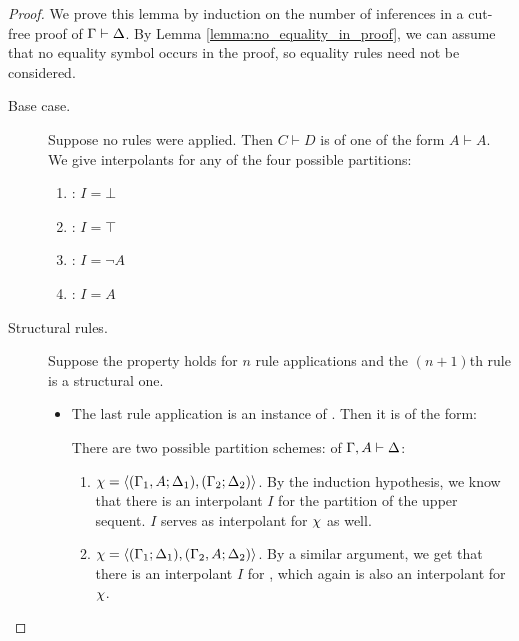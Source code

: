\begin{proof}
	We prove this lemma by induction on the number of inferences in a cut-free proof of $\Gamma \vdash \Delta$.
	By Lemma \ref{lemma:no_equality_in_proof}, we can assume that no equality symbol occurs in the proof, so equality rules need not be considered. 
	\begin{description}
		\item[\normalfont Base case.]
			Suppose no rules were applied.
			Then $C \vdash D$ is of one of the form
				$A \vdash A$. We give interpolants for any of the four possible partitions:
					\begin{enumerate}
						\item {}: $I=\bot$
						\item {}: $I=\top$
						\item {}: $I=\lnot A$\nopagebreak
						\item {}: $I=A$
					\end{enumerate}

		\item[\normalfont Structural rules.]
			Suppose the property holds for $n$ rule applications and the $(n+1)$th rule is a structural one.

			\begin{itemize}
				\item The last rule application is an instance of . Then it is of the form:
					\begin{prooftree}
					\end{prooftree}

					There are two possible partition schemes: of $\Gamma, A \vdash \Delta$:
					\begin{enumerate}
						\item $\chi =  \langle (\Gamma_1, A; \Delta_1), (\Gamma_2; \Delta_2)\rangle $.
							By the induction hypothesis, we know that there is an interpolant $I$ for the partition  of the upper sequent.
							$I$ serves as interpolant for $\chi$ as well.

						\item $\chi =  \langle (\Gamma_1; \Delta_1), (\Gamma_2, A; \Delta_2)\rangle $.
							By a similar argument, we get that there is an interpolant $I$ for 
							, which again is also an interpolant for $\chi$.


\end{enumerate}
\end{itemize}
\end{description}
\end{proof}
